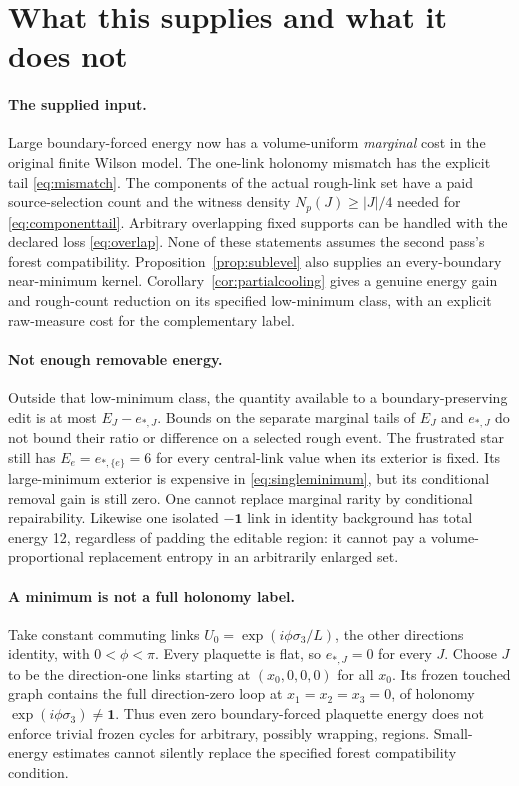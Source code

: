 \documentclass[11pt]{article}
\theoremstyle{remark}
\newcommand{\one}{\mathbf 1}
\begin{document}
\section{What this supplies and what it does not}
\paragraph{The supplied input.}
Large boundary-forced energy now has a volume-uniform \emph{marginal}
cost in the original finite Wilson model. The one-link holonomy mismatch
has the explicit tail \eqref{eq:mismatch}. The components of the actual
rough-link set have a paid source-selection count and the witness density
$N_p(J)\ge |J|/4$ needed for \eqref{eq:componenttail}. Arbitrary overlapping
fixed supports can be handled with the declared loss \eqref{eq:overlap}.
None of these statements assumes the second pass's forest compatibility.
Proposition~\ref{prop:sublevel} also supplies an every-boundary near-minimum
kernel. Corollary~\ref{cor:partialcooling} gives a genuine energy gain and
rough-count reduction on its specified low-minimum class, with an explicit
raw-measure cost for the complementary label.

\paragraph{Not enough removable energy.}
Outside that low-minimum class, the quantity available to a boundary-preserving edit is at most
$E_J-e_{*,J}$. Bounds on the separate marginal tails of $E_J$ and $e_{*,J}$
do not bound their ratio or difference on a selected rough event.
The frustrated star still has $E_e=e_{*,\{e\}}=6$ for every central-link
value when its exterior is fixed. Its large-minimum exterior is expensive
in \eqref{eq:singleminimum}, but its conditional removal gain is still zero.
One cannot replace marginal rarity by conditional repairability.
Likewise one isolated $-\one$ link in identity background has total
energy 12, regardless of padding the editable region: it cannot pay a
volume-proportional replacement entropy in an arbitrarily enlarged set.

\paragraph{A minimum is not a full holonomy label.}
Take constant commuting links $U_0=\exp(i\phi\sigma_3/L)$, the other
directions identity, with $0<\phi<\pi$. Every plaquette is flat, so
$e_{*,J}=0$ for every $J$. Choose $J$ to be the direction-one links
starting at $(x_0,0,0,0)$ for all $x_0$. Its frozen touched graph contains
the full direction-zero loop at $x_1=x_2=x_3=0$, of holonomy
$\exp(i\phi\sigma_3)\ne\one$. Thus even zero boundary-forced plaquette
energy does not enforce trivial frozen cycles for arbitrary, possibly
wrapping, regions. Small-energy estimates cannot silently replace the
specified forest compatibility condition.
\end{document}

